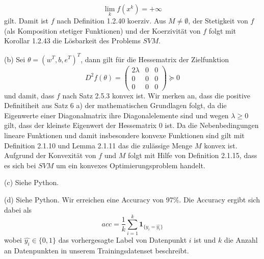 \documentclass[ngerman, a4paper,12pt]{article}
\begin{document}
\begin{equation*}
	\lim\limits_{k} f(x^k) = +\infty
\end{equation*}
gilt. Damit ist $f$ nach Definition 1.2.40 koerziv. Aus $M \neq \emptyset$, der Stetigkeit von $f$ (als Komposition stetiger Funktionen) und der Koerzivität von $f$ folgt mit Korollar 1.2.43 die Lösbarkeit des Problems $SVM$. \par
(b) Sei $\theta = (w^T, b, e^T)^T$, dann gilt für die Hessematrix der Zielfunktion
\begin{equation*}
	D^2 f(\theta) = \begin{pmatrix}
	2\lambda &0 &0 \\
	0 & 0 & 0 \\
	0 & 0 & 0 
	\end{pmatrix} \succeq 0
\end{equation*}
und damit, dass $f$ nach Satz 2.5.3 konvex ist. Wir merken an, dass die positive Definitiheit aus Satz 6 a) der mathematischen Grundlagen folgt, da die Eigenwerte einer Diagonalmatrix ihre Diagonalelemente sind und wegen $\lambda \geq 0$ gilt, dass der kleinste Eigenwert der Hessematrix $0$ ist. Da die Nebenbedingungen lineare Funktionen und damit insbesondere konvexe Funktionen sind gilt mit Definition 2.1.10 und Lemma 2.1.11 das die zulässige Menge $M$ konvex ist. Aufgrund der Konvexität von $f$ und $M$ folgt mit Hilfe von Definition 2.1.15, dass es sich bei $SVM$ um ein konvexes Optimierungsproblem handelt.
\par
(c) Siehe Python. \par
(d) Siehe Python. Wir erreichen eine Accuracy von $97 \%$. Die Accuracy ergibt sich dabei als
\begin{equation}
	acc = \frac{1}{k} \sum_{i=1}^{k} \mathbf{1}_{ \{ y_i=\hat{y_i}\} }
\end{equation}
wobei $\hat{y_i} \in \{0, 1\}$ das vorhergesagte Label von Datenpunkt $i$ ist und $k$ die Anzahl an Datenpunkten in unserem Trainingsdatenset beschreibt.
\end{document}
